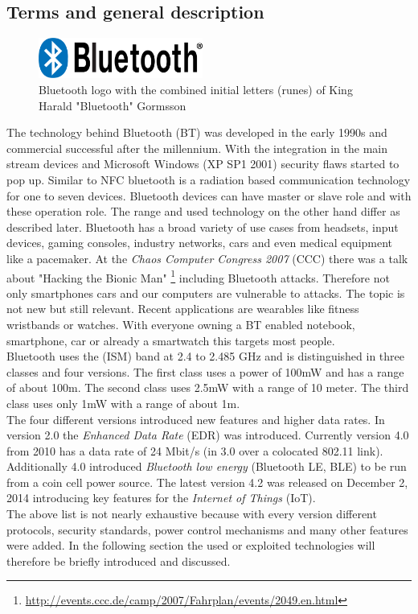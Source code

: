 \documentclass[12pt,a4paper]{article}
\begin{document}
\subsection{Terms and general description}
\begin{figure}
  \begin{center}
    \includegraphics[width=0.48\textwidth]{img/730px-Bluetooth-Logo.png}
  \end{center}
  \caption{Bluetooth logo with the combined initial letters (runes) of King Harald "Bluetooth" Gormsson}
  \label{img_bt_logo}
\end{figure}
The technology behind Bluetooth (BT) was developed in the early 1990s and commercial successful after the millennium. With the integration in the main stream devices and Microsoft Windows (XP SP1 2001) security flaws started to pop up. Similar to NFC bluetooth is a radiation based communication technology for one to seven devices. Bluetooth devices can have master or slave role and with these operation role. The range and used technology on the other hand differ as described later. 
Bluetooth has a broad variety of use cases from headsets, input devices, gaming consoles, industry networks, cars and even medical equipment like a pacemaker. At the \emph{Chaos Computer Congress 2007} (CCC) there was a talk about "Hacking the Bionic Man" \footnote{\url{http://events.ccc.de/camp/2007/Fahrplan/events/2049.en.html}} including Bluetooth attacks. Therefore not only smartphones cars and our computers are vulnerable to attacks.
The topic is not new but still relevant. Recent applications are wearables like fitness wristbands or watches. With everyone owning a BT enabled notebook, smartphone, car or already a smartwatch this targets most people. \\
Bluetooth uses the (ISM) band at 2.4 to 2.485 GHz and is distinguished in three classes and four versions. The first class uses a power of 100mW and has a range of about 100m. The second class uses 2.5mW with a range of 10 meter. The third class uses only 1mW with a range of about 1m.\\
The four different versions introduced new features and higher data rates. In version 2.0 the \emph{Enhanced Data Rate} (EDR) was introduced. Currently version 4.0 from 2010 has a data rate of 24 Mbit/s (in 3.0 over a colocated 802.11 link). Additionally 4.0 introduced \emph{Bluetooth low energy} (Bluetooth LE, BLE) to be run from a coin cell power source. The latest version 4.2 was released on December 2, 2014 introducing key features for the \emph{Internet of Things} (IoT).\\
The above list is not nearly exhaustive because with every version different protocols, security standards, power control mechanisms and many other features were added. In the following section the used or exploited technologies will therefore be briefly introduced and discussed.
\end{document}
